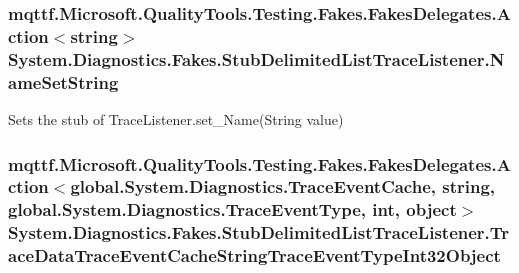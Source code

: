 \hypertarget{class_system_1_1_diagnostics_1_1_fakes_1_1_stub_delimited_list_trace_listener_ade9e7c28b08020afd5024a4483b86a91}{
\subsubsection[{Name\-Set\-String}]{\setlength{\rightskip}{0pt plus 5cm}mqttf.\-Microsoft.\-Quality\-Tools.\-Testing.\-Fakes.\-Fakes\-Delegates.\-Action$<$string$>$ System.\-Diagnostics.\-Fakes.\-Stub\-Delimited\-List\-Trace\-Listener.\-Name\-Set\-String}}\label{class_system_1_1_diagnostics_1_1_fakes_1_1_stub_delimited_list_trace_listener_ade9e7c28b08020afd5024a4483b86a91}


Sets the stub of Trace\-Listener.\-set\-\_\-\-Name(\-String value)

\hypertarget{class_system_1_1_diagnostics_1_1_fakes_1_1_stub_delimited_list_trace_listener_a95242a7b9e103ebe344497f442777181}{
\subsubsection[{Trace\-Data\-Trace\-Event\-Cache\-String\-Trace\-Event\-Type\-Int32\-Object}]{\setlength{\rightskip}{0pt plus 5cm}mqttf.\-Microsoft.\-Quality\-Tools.\-Testing.\-Fakes.\-Fakes\-Delegates.\-Action$<$global.\-System.\-Diagnostics.\-Trace\-Event\-Cache, string, global.\-System.\-Diagnostics.\-Trace\-Event\-Type, int, object$>$ System.\-Diagnostics.\-Fakes.\-Stub\-Delimited\-List\-Trace\-Listener.\-Trace\-Data\-Trace\-Event\-Cache\-String\-Trace\-Event\-Type\-Int32\-Object}}\label{class_system_1_1_diagnostics_1_1_fakes_1_1_stub_delimited_list_trace_listener_a95242a7b9e103ebe344497f442777181}


